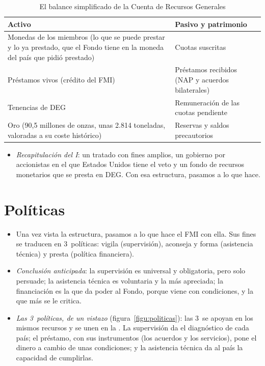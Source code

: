\documentclass[11pt]{article}
\begin{document}
\begin{table}[H]
\centering\small
\caption{El balance simplificado de la Cuenta de Recursos Generales}\label{tab:balance}
\begin{tabular}{>{\raggedright\arraybackslash}p{6.4cm}|>{\raggedright\arraybackslash}p{6.4cm}}
\toprule
\rowcolor{tceeazulpalido}
\textbf{Activo} & \textbf{Pasivo y patrimonio}\\
\midrule
Monedas de los miembros (lo que se puede prestar y lo ya prestado, que el Fondo tiene en la moneda del país que pidió prestado) & Cuotas suscritas\\
Préstamos vivos (crédito del FMI) & Préstamos recibidos (NAP y acuerdos bilaterales)\\
Tenencias de DEG & Remuneración de las cuotas pendiente\\
Oro (90,5 millones de onzas, unas 2.814 toneladas, valoradas a su coste histórico) & Reservas y saldos precautorios\\
\bottomrule
\end{tabular}
\end{table}

\begin{itemize}
\item \emph{Recapitulación del I}: un tratado con fines amplios, un gobierno por accionistas en el que Estados Unidos tiene el veto y un fondo de recursos monetarios que se presta en DEG. Con esa estructura, pasamos a lo que hace.
\end{itemize}

\section{Políticas}\label{sec:politicas}

\begin{itemize}
\item Una vez vista la estructura, pasamos a lo que hace el FMI con ella. Sus fines se traducen en 3~políticas: vigila (supervisión), aconseja y forma (asistencia técnica) y presta (política financiera).
\item \emph{Conclusión anticipada}: la supervisión es universal y obligatoria, pero solo persuade; la asistencia técnica es voluntaria y la más apreciada; la financiación es la que da poder al Fondo, porque viene con condiciones, y la que más se le critica.
\item \emph{Las 3~políticas, de un vistazo} (figura~\ref{figu:politicas}): las 3~se apoyan en los mismos recursos y se unen en la . La supervisión da el diagnóstico de cada país; el préstamo, con sus instrumentos (los acuerdos y los servicios), pone el dinero a cambio de unas condiciones; y la asistencia técnica da al país la capacidad de cumplirlas.
\end{itemize}
\end{document}
